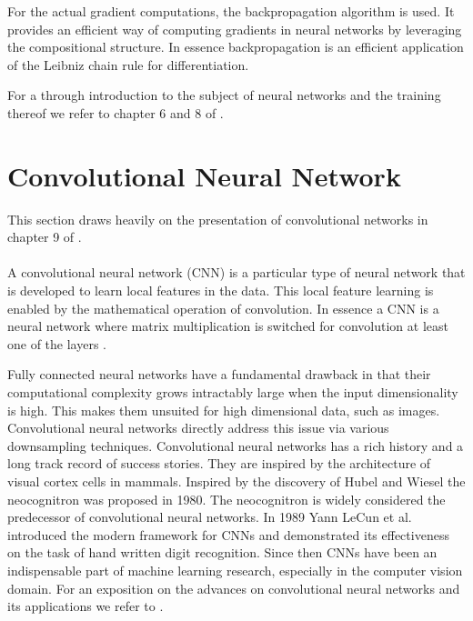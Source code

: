 \documentclass[../../thesis.tex]{subfiles}
\begin{document}
For the actual gradient computations, the backpropagation algorithm is used. It provides an efficient way of computing gradients in neural networks by leveraging the compositional structure. In essence backpropagation is an efficient application of the Leibniz chain rule for differentiation.\newline

For a through introduction to the subject of neural networks and the training thereof we refer to chapter 6 and 8 of \cite{deeplearningbook}.


\section{Convolutional Neural Network}
This section draws heavily on the presentation of convolutional networks in chapter 9 of \cite{deeplearningbook}.\\\\

A convolutional neural network (CNN) is a particular type of neural network that is developed to learn local features in the data. This local feature learning is enabled by the mathematical operation of convolution. In essence a CNN is a neural network where matrix multiplication is switched for convolution at least one of the layers \cite{deeplearningbook}. \newline

Fully connected neural networks have a fundamental drawback in that their computational complexity grows intractably large when the input dimensionality is high. This makes them unsuited for high dimensional data, such as images. Convolutional neural networks directly address this issue via various downsampling techniques. Convolutional neural networks has a rich history and a long track record of success stories. They are inspired by the architecture of visual cortex cells in mammals. Inspired by the discovery of Hubel and Wiesel \cite{https://doi.org/10.1113/jphysiol.1968.sp008455} the neocognitron was proposed in 1980\cite{6313076}. The neocognitron is widely considered the predecessor of convolutional neural networks. In 1989 Yann LeCun et al. introduced the modern framework for CNNs \cite{LeCun1989ConvNet} and demonstrated its effectiveness on the task of hand written digit recognition. Since then CNNs have been an indispensable part of machine learning research, especially in the computer vision domain. For an exposition on the advances on convolutional neural networks and its applications we refer to \cite{gu2017recent}.
\end{document}
